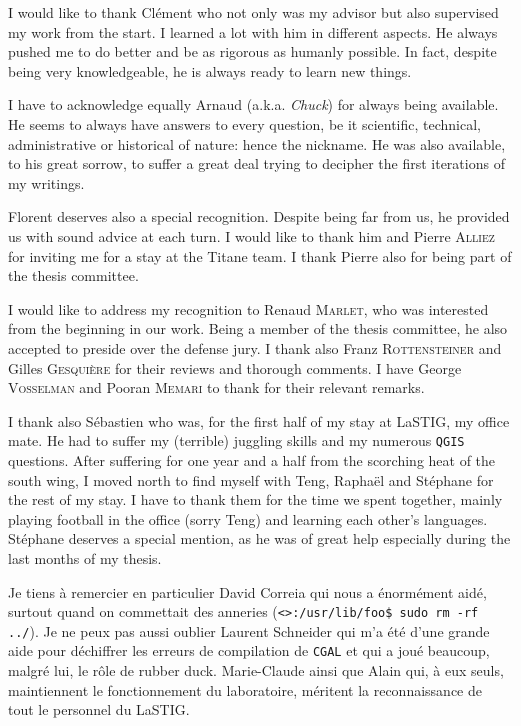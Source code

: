 I would like to thank Clément who not only was my advisor but also supervised my work from the start.
I learned a lot with him in different aspects.
He always pushed me to do better and be as rigorous as humanly possible.
In fact, despite being very knowledgeable, he is always ready to learn new things.

I have to acknowledge equally Arnaud (a.k.a. \textit{Chuck}) for always being available.
He seems to always have answers to every question, be it scientific, technical, administrative or historical of nature: hence the nickname.
He was also available, to his great sorrow, to suffer a great deal trying to decipher the first iterations of my writings.

Florent deserves also a special recognition.
Despite being far from us, he provided us with sound advice at each turn.
I would like to thank him and Pierre \textsc{Alliez} for inviting me for a stay at the Titane team.
I thank Pierre also for being part of the thesis committee.

I would like to address my recognition to Renaud \textsc{Marlet}, who was interested from the beginning in our work.
Being a member of the thesis committee, he also accepted to preside over the defense jury.
I thank also Franz \textsc{Rottensteiner} and Gilles \textsc{Gesquière} for their reviews and thorough comments.
I have George \textsc{Vosselman} and Pooran \textsc{Memari} to thank for their relevant remarks.

I thank also Sébastien who was, for the first half of my stay at LaSTIG, my office mate.
He had to suffer my (terrible) juggling skills and my numerous \verb!QGIS! questions.
After suffering for one year and a half from the scorching heat of the south wing, I moved north to find myself with Teng, Raphaël and Stéphane for the rest of my stay.
I have to thank them for the time we spent together, mainly playing football in the office (sorry Teng) and learning each other's languages.
Stéphane deserves a special mention, as he was of great help especially during the last months of my thesis.


Je tiens à remercier en particulier David Correia qui nous a énormément aidé, surtout quand on commettait des anneries (\verb!<>:/usr/lib/foo$ sudo rm -rf ../!).
Je ne peux pas aussi oublier Laurent Schneider qui m'a été d'une grande aide pour déchiffrer les erreurs de compilation de \verb!CGAL! et qui a joué beaucoup, malgré lui, le rôle de rubber duck.
Marie-Claude ainsi que Alain qui, à eux seuls, maintiennent le fonctionnement du laboratoire, méritent la reconnaissance de tout le personnel du LaSTIG.

